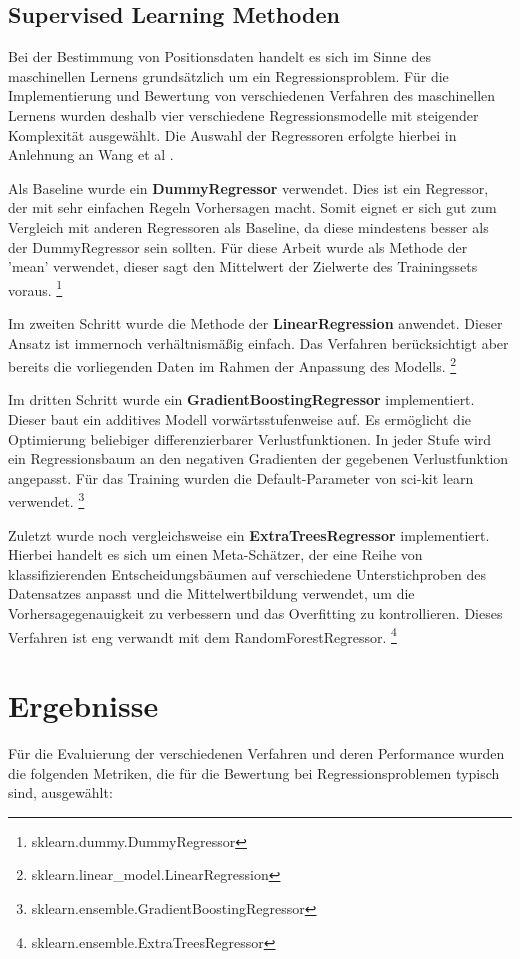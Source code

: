 \documentclass{svproc}
\begin{document}
\subsection{Supervised Learning Methoden}

Bei der Bestimmung von Positionsdaten handelt es sich im Sinne des maschinellen Lernens grundsätzlich um ein Regressionsproblem. Für die Implementierung und Bewertung von verschiedenen Verfahren des maschinellen Lernens wurden deshalb vier verschiedene Regressionsmodelle mit steigender Komplexität ausgewählt. Die Auswahl der Regressoren erfolgte hierbei in Anlehnung an Wang et al \cite{Wang2020}.

Als Baseline wurde ein \textbf{DummyRegressor} verwendet. Dies ist ein Regressor, der mit sehr einfachen Regeln Vorhersagen macht.
Somit eignet er sich gut zum Vergleich mit anderen Regressoren als Baseline, da diese mindestens besser als der DummyRegressor sein sollten. Für diese Arbeit wurde als Methode der 'mean' verwendet, dieser sagt den Mittelwert der Zielwerte des Trainingssets voraus. \footnote {sklearn{.}dummy{.}DummyRegressor}


Im zweiten Schritt wurde die Methode der \textbf{LinearRegression} anwendet. Dieser Ansatz ist immernoch verhältnismäßig einfach. Das Verfahren berücksichtigt aber bereits die vorliegenden Daten im Rahmen der Anpassung des Modells.
\footnote {sklearn{.}{linear}{\_}{model}{.}LinearRegression}

Im dritten Schritt wurde ein \textbf{GradientBoostingRegressor} implementiert. Dieser baut ein additives Modell vorwärtsstufenweise auf. Es ermöglicht die Optimierung beliebiger differenzierbarer Verlustfunktionen. In jeder Stufe wird ein Regressionsbaum an den negativen Gradienten der gegebenen Verlustfunktion angepasst. Für das Training wurden die Default-Parameter von sci-kit learn verwendet. \footnote{sklearn{.}ensemble{.}GradientBoostingRegressor}


Zuletzt wurde noch vergleichsweise ein \textbf{ExtraTreesRegressor} implementiert. Hierbei handelt es sich um einen Meta-Schätzer, der eine Reihe von klassifizierenden Entscheidungsbäumen auf verschiedene Unterstichproben des Datensatzes anpasst und die Mittelwertbildung verwendet, um die Vorhersagegenauigkeit zu verbessern und das Overfitting zu kontrollieren. Dieses Verfahren ist eng verwandt mit dem RandomForestRegressor. \footnote{sklearn{.}ensemble{.}ExtraTreesRegressor}
%
%
\section{Ergebnisse}
%
Für die Evaluierung der verschiedenen Verfahren und deren Performance wurden die folgenden Metriken, die für die Bewertung bei Regressionsproblemen typisch sind, ausgewählt:
\end{document}
